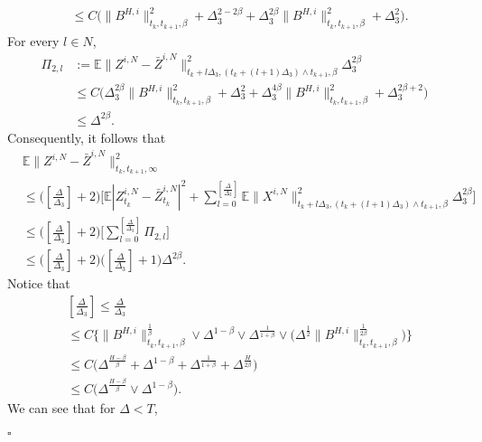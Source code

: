 \documentclass[12pt]{article}
\def\E{\mathbb E}
\newenvironment{proof}{{\noindent\it Proof.}\ }{\hfill $\square$\par}
\numberwithin{equation}{section}
\begin{document}
\begin{proof}
\begin{equation}
\begin{aligned}
		&\leq C\Big(\|B^{H,i}\|^2_{t_k,t_{k+1},\beta}+\Delta_3^{2-2\beta}+\Delta_3^{2\beta}\|B^{H,i}\|^2_{t_k,t_{k+1},\beta}+\Delta_3^2\Big).
	\end{aligned}
\end{equation}	
For every $l\in N$,
\begin{align*}
	\Pi_{2,l}&:=\E\|Z^{i,N}-\bar{Z}^{i,N}\|^2_{t_k+l\Delta_3,(t_k+(l+1)\Delta_3)\wedge t_{k+1},\beta}\Delta_3^{2\beta}\\
	&\leq C\Big(\Delta_3^{2\beta}\|B^{H,i}\|^2_{t_k,t_{k+1},\beta}+\Delta_3^{2}+\Delta_3^{4\beta}\|B^{H,i}\|^2_{t_k,t_{k+1},\beta}+\Delta_3^{2\beta+2}\Big)\\
	&\leq \Delta^{2\beta}.
\end{align*}
Consequently, it follows that
	\begin{equation}
	\begin{aligned}
		&\E\|Z^{i,N}-\bar Z^{i,N}\|^2_{t_k,t_{k+1},\infty}\\
		&\leq
		\big([\frac{\Delta}{\Delta_3}]+2 \big) \Big[\E|Z^{i,N}_{t_k}-\bar{Z}^{i,N}_{t_k}|^2+\sum_{l=0}^{[\frac{\Delta}{\Delta_3}]}\E\|X^{i,N}\|^2_{t_k+l\Delta_3,(t_k+(l+1)\Delta_3)\wedge t_{k+1},\beta}\Delta_3^{2\beta}\Big]\\
		&\leq \big([\frac{\Delta}{\Delta_3}]+2 \big)
		\Big[\sum_{l=0}^{[\frac{\Delta}{\Delta_3}]}\Pi_{2,l}\Big]\\
		&\leq \big([\frac{\Delta}{\Delta_3}]+2 \big)\big([\frac{\Delta}{\Delta_3}]+1 \big)\Delta^{2\beta}.
	\end{aligned}
\end{equation}
Notice that
\begin{equation}
	\begin{aligned}
		&[\frac{\Delta}{\Delta_3}]\leq \frac{\Delta}{\Delta_3}\\
		&\leq C\Bigg\{\Big\|B^{H,i}\|^{\frac{1}{\beta}}_{t_k,t_{k+1},\beta}\vee \Delta^{1-\beta}
		\vee  \Delta^{\frac{1}{1+\beta}}\vee \Big( \Delta^{\frac{1}{2}}\|B^{H,i}\|^{\frac{1}{2\beta}}_{t_k,t_{k+1},\beta}\Big)\Bigg\}\\
		&\leq  C\Bigg(\Delta^{\frac{H-\beta}{\beta}}+  \Delta^{1-\beta}+  \Delta^{\frac{1}{1+\beta}}+  \Delta^{\frac{H}{2\beta}}\Bigg)\\
		&\leq C\Big(\Delta^{\frac{H-\beta}{\beta}}\vee \Delta^{1-\beta}\Big).
	\end{aligned}
\end{equation}
We can see that for $\Delta<T$,
\begin{equation}
	\begin{aligned}

\end{aligned}
\end{equation}
\end{proof}
\end{document}
